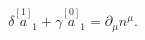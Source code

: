 \begin{equation}
\delta \stackrel{[1]}{a}_{1}+\gamma \stackrel{[0]}{a}_{1}=\partial _{\mu
}n^{\mu }.  \label{bf72}
\end{equation}

